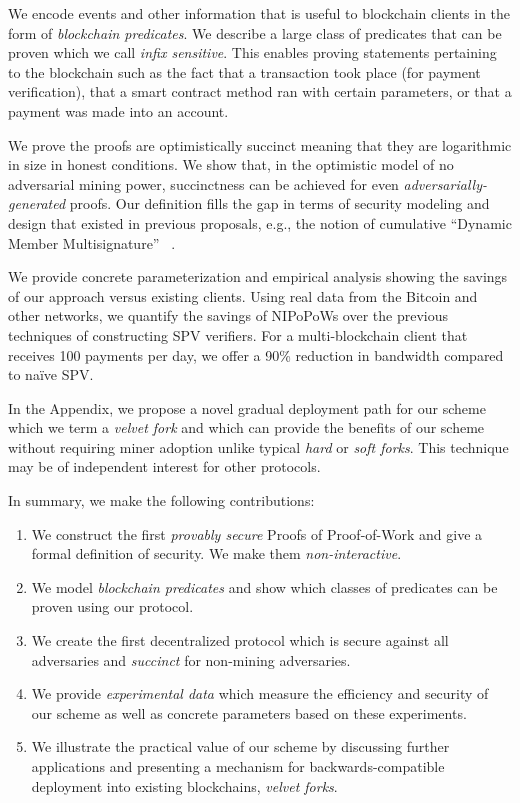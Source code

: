 We encode events and other information that is useful to blockchain clients in
the form of \emph{blockchain predicates}. We describe a large class of
predicates that can be proven which we call \emph{infix sensitive}. This enables
proving statements pertaining to the blockchain such as the fact that a
transaction took place (for payment verification), that a smart contract method
ran with certain parameters, or that a payment was made into an account.

We prove the proofs are optimistically succinct meaning that they are
logarithmic in size in honest conditions. We show that, in the optimistic model
of no adversarial mining power, succinctness can be achieved for even
\emph{adversarially-generated} proofs. Our definition fills the gap in terms of
security modeling and design that existed in previous proposals, e.g., the
notion of cumulative ``Dynamic Member Multisignature'' ~\cite{sidechains}.

We provide concrete parameterization and empirical analysis showing the savings
of our approach versus existing clients. Using real data from the Bitcoin and
other networks, we quantify the savings of NIPoPoWs over the previous techniques
of constructing SPV verifiers. For a multi-blockchain client that receives 100
payments per day, we offer a 90\% reduction in bandwidth compared to na\"ive
SPV.

In the Appendix, we propose a novel gradual deployment path for our scheme which
we term a \emph{velvet fork} and which can provide the benefits of our scheme
without requiring miner adoption unlike typical \emph{hard} or \emph{soft
forks}. This technique may be of independent interest for other protocols.

In summary, we make the following contributions:
\begin{enumerate}
  \item We construct the first \emph{provably secure} Proofs of Proof-of-Work
        and give a formal definition of security. We make them
        \emph{non-interactive}.
  \item We model \emph{blockchain predicates} and show which classes of
        predicates can be proven using our protocol.
  \item We create the first decentralized protocol which is secure against all
        adversaries and \emph{succinct} for non-mining adversaries.
  \item We provide \emph{experimental data} which measure the efficiency and
        security of our scheme as well as concrete parameters based on these
        experiments.
  \item We illustrate the practical value of our scheme by discussing further
        applications and presenting a mechanism for backwards-compatible
        deployment into existing blockchains, \emph{velvet forks}.
\end{enumerate}

